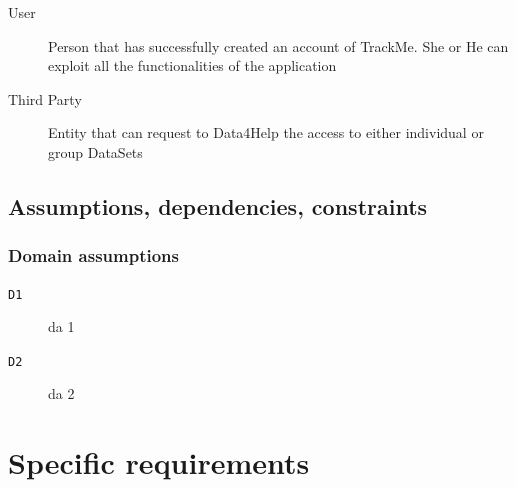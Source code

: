 \documentclass[12pt]{article}
\begin{document}
      \begin{description}
        \item [User] Person that has successfully created an account of TrackMe. She or He can exploit all the functionalities of the application
        \item [Third Party] Entity that can request to Data4Help  the access  to either individual or group DataSets
      \end{description}

  \subsection{Assumptions, dependencies, constraints}

    \subsubsection{Domain assumptions}

      \begin{description}
        \item[\texttt{D1}] da 1
        \item[\texttt{D2}] da 2
      \end{description}


\clearpage
\section{Specific requirements}
\label{sec:specreq}
\end{document}
